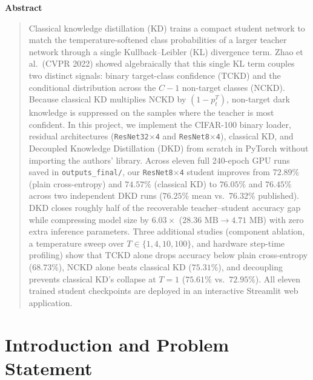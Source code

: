 \documentclass[11pt]{article}
\begin{document}
\vspace{0.2em}
\begin{center}
\textbf{Abstract}
\end{center}
\vspace{-0.55em}
\begin{quote}
\noindent Classical knowledge distillation (KD) trains a compact student network to match the temperature-softened class probabilities of a larger teacher network through a single Kullback--Leibler (KL) divergence term. Zhao et al.\ (CVPR 2022) showed algebraically that this single KL term couples two distinct signals: binary target-class confidence (\(\mathrm{TCKD}\)) and the conditional distribution across the \(C-1\) non-target classes (\(\mathrm{NCKD}\)). Because classical KD multiplies \(\mathrm{NCKD}\) by \((1 - p_t^T)\), non-target dark knowledge is suppressed on the samples where the teacher is most confident. In this project, we implement the CIFAR-100 binary loader, residual architectures (\texttt{ResNet32$\times$4} and \texttt{ResNet8$\times$4}), classical KD, and Decoupled Knowledge Distillation (DKD) from scratch in PyTorch without importing the authors' library. Across eleven full 240-epoch GPU runs saved in \texttt{outputs\_final/}, our \texttt{ResNet8$\times$4} student improves from \(72.89\%\) (plain cross-entropy) and \(74.57\%\) (classical KD) to \(76.05\%\) and \(76.45\%\) across two independent DKD runs (\(76.25\%\) mean vs.\ \(76.32\%\) published). DKD closes roughly half of the recoverable teacher--student accuracy gap while compressing model size by \(6.03\times\) (\(28.36\text{ MB} \rightarrow 4.71\text{ MB}\)) with zero extra inference parameters. Three additional studies (component ablation, a temperature sweep over \(T \in \{1, 4, 10, 100\}\), and hardware step-time profiling) show that \(\mathrm{TCKD}\) alone drops accuracy below plain cross-entropy (\(68.73\%\)), \(\mathrm{NCKD}\) alone beats classical KD (\(75.31\%\)), and decoupling prevents classical KD's collapse at \(T=1\) (\(75.61\%\) vs.\ \(72.95\%\)). All eleven trained student checkpoints are deployed in an interactive Streamlit web application.
\end{quote}

\clearpage
\tableofcontents
\clearpage

\section{Introduction and Problem Statement}
\label{sec:intro}
\end{document}
